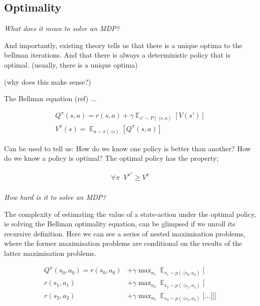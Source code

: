 \hypertarget{optimality}{%
\subsection{\color{red}Optimality}\label{optimality}}

\begin{displayquote}
  \textit{What does it mean to solve an MDP?}
\end{displayquote}

And importantly, existing theory tells us that there is a unique optima to the bellman iterations.
And that there is always a deterministic policy that is optimal. (usually, there is a unique optima)

(why does this make sense?)

The Bellman equation (ref) ...

\begin{align*}
Q^{\pi}(s, a) = r(s, a) + \gamma \mathop{\mathbb E}_{s' \sim P(\cdot|s, a)} [V(s')] \label{eq:bellman-eqn}\tag{Bellman equation}\\
V^{\pi}(s) = \mathop{\mathbb E}_{a \sim \pi(\cdot|s)} [Q^{\pi}(s, a)]
\end{align*}

Can be used to tell us: How do we know one policy is better than another? How do we know a
policy is optimal? The optimal policy has the property;

\begin{align*}
\forall \pi\;\; V^{\pi^* } \ge V^{\pi} \\
\end{align*}


\begin{displayquote}
  \textit{How hard is it to solve an MDP?}
\end{displayquote}


The complexity of estimating the value of a state-action under the optimal policy, ie solving the Bellman optimality
equation, can be glimpsed if we unroll its recursive definition.
Here we can see a series of nested maximisation problems, where the former
maximisation problems are conditional on the results of the latter maximisation problems.

\begin{align*}
Q^{\pi}(s_0, a_0) = r(s_0, a_0) &+ \gamma \mathop{\text{max}}_{a_1} \mathop{\mathbb E}_{s_1\sim p(\cdot | s_0, a_0)} \Bigg[ \\
r(s_1, a_1)  &+ \gamma \mathop{\text{max}}_{a_2} \mathop{\mathbb E}_{s_2\sim p(\cdot | s_1, a_1)} \bigg[\\
r(s_2, a_2)  &+ \gamma \mathop{\text{max}}_{a_3} \mathop{\mathbb E}_{s_3\sim p(\cdot | s_2, a_2)} \Big[
\dots \Big] \bigg] \Bigg]
\end{align*}

